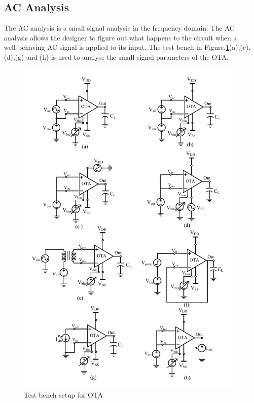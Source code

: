 \subsection{AC Analysis}
The AC analysis is a small signal analysis in the frequency domain. The AC analysis allows the designer to figure out what happens to the circuit when a well-behaving AC signal is applied to its input.  The test bench in Figure.\ref{fig:OTA_TB}(a),(c),(d),(g) and (h) is used to analyse the small signal parameters of the OTA.

\begin{figure} [H]
\centering
\includegraphics[scale=0.8]{Figures/Test_Benches/OTA_TB.pdf}
\caption{Test bench setup for OTA}
\label{fig:OTA_TB}
\end{figure}

